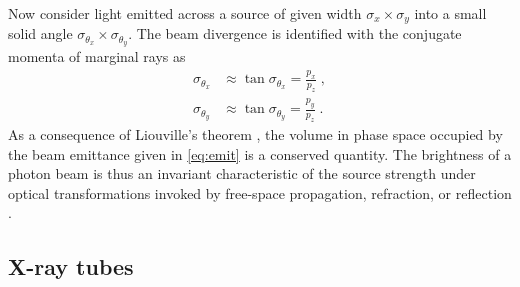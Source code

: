 \documentclass[
twoside,
openright,
titlepage,
numbers=noenddot,
headinclude,
fleqn,
a4paper,
footinclude=true,
cleardoublepage=empty,
abstractoff,
BCOR=5mm,
paper=a4,
fontsize=11pt,
british,ngerman,american,
]{scrreprt}
\begin{document}
Now consider light emitted across a source of given width $\sigma_x
\times \sigma_y$ into a small solid angle $\sigma_{\theta_x} \times
\sigma_{\theta_y}$.  The beam divergence is identified with the
conjugate momenta of marginal rays as
\begin{equation}
  \label{eq:beam-divergence}
  \begin{split}
     \sigma_{\theta_x} &\approx \tan \sigma_{\theta_x} = \frac{p_x}{p_z}\;,
  \\ \sigma_{\theta_y} &\approx \tan \sigma_{\theta_y} = \frac{p_y}{p_z}\;.
  \end{split}
\end{equation}
As a consequence of Liouville's theorem \cite{Gibbs1902}, the volume
in phase space occupied by the beam emittance given in \cref{eq:emit}
is a conserved quantity.  The brightness of a photon beam is thus an
invariant characteristic of the source strength under optical
transformations invoked by free-space propagation, refraction, or
reflection \cite{Kim1986}.



\subsection{X-ray tubes}
\label{sec:tubes}
\end{document}
